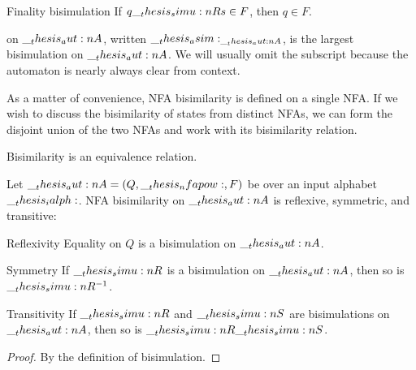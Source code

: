 \begin{definition}
\begin{thmdescription}[noitemsep]
  \item[Finality bisimulation]
    If $q \__thesis_simu:n {R} s \in F$, then $q \in F$.
  \end{thmdescription}
   on $\__thesis_aut:n {A}$, written $\__thesis_asim:_{\__thesis_aut:n {A}}$, is the largest bisimulation on $\__thesis_aut:n {A}$.
  We will usually omit the subscript because the automaton is nearly always clear from context.
\end{definition}

As a matter of convenience, \ac{NFA} bisimilarity is defined on a single \ac{NFA}.
If we wish to discuss the bisimilarity of states from distinct \acp{NFA}, we can form the disjoint union of the two \acp{NFA} and work with its bisimilarity relation.

Bisimilarity is an equivalence relation.
\begin{theorem}\label{thm:nfa-bisim-equiv}
  Let $\__thesis_aut:n {A} = (Q, \__thesis_nfapow:, F)$ be  over an input alphabet $\__thesis_ialph:$.
  \Ac{NFA} bisimilarity on $\__thesis_aut:n {A}$ is reflexive, symmetric, and transitive:
  \begin{thmdescription}[nosep]
  \item[Reflexivity] Equality on $Q$ is a bisimulation on $\__thesis_aut:n {A}$.
  \item[Symmetry] If $\__thesis_simu:n {R}$ is a bisimulation on $\__thesis_aut:n {A}$, then so is $\__thesis_simu:n {R}^{-1}$.
  \item[Transitivity] If $\__thesis_simu:n {R}$ and $\__thesis_simu:n {S}$ are bisimulations on $\__thesis_aut:n {A}$, then so is $\__thesis_simu:n {R}\__thesis_simu:n {S}$.
  \end{thmdescription}
\end{theorem}
\begin{proof}
  By the definition of bisimulation.
\end{proof}


